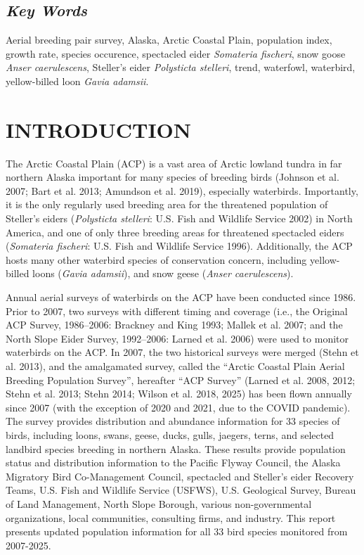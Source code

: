 \documentclass[
]{article}
\begin{document}
\subsection*{\texorpdfstring{\emph{Key
Words}}{Key Words}}\label{key-words}

Aerial breeding pair survey, Alaska, Arctic Coastal Plain, population
index, growth rate, species occurence, spectacled eider \emph{Somateria
fischeri}, snow goose \emph{Anser caerulescens}, Steller's eider
\emph{Polysticta stelleri}, trend, waterfowl, waterbird, yellow-billed
loon \emph{Gavia adamsii}.

\newpage{}

\section*{INTRODUCTION}\label{introduction}

The Arctic Coastal Plain (ACP) is a vast area of Arctic lowland tundra
in far northern Alaska important for many species of breeding birds
(Johnson et al. 2007; Bart et al. 2013; Amundson et al. 2019),
especially waterbirds. Importantly, it is the only regularly used
breeding area for the threatened population of Steller's eiders
(\emph{Polysticta stelleri}: U.S. Fish and Wildlife Service 2002) in
North America, and one of only three breeding areas for threatened
spectacled eiders (\emph{Somateria fischeri}: U.S. Fish and Wildlife
Service 1996). Additionally, the ACP hosts many other waterbird species
of conservation concern, including yellow-billed loons (\emph{Gavia
adamsii}), and snow geese (\emph{Anser caerulescens}).

Annual aerial surveys of waterbirds on the ACP have been conducted since
1986. Prior to 2007, two surveys with different timing and coverage
(i.e., the Original ACP Survey, 1986--2006: Brackney and King 1993;
Mallek et al. 2007; and the North Slope Eider Survey, 1992--2006: Larned
et al. 2006) were used to monitor waterbirds on the ACP. In 2007, the
two historical surveys were merged (Stehn et al. 2013), and the
amalgamated survey, called the ``Arctic Coastal Plain Aerial Breeding
Population Survey'', hereafter ``ACP Survey'' (Larned et al. 2008, 2012;
Stehn et al. 2013; Stehn 2014; Wilson et al. 2018, 2025) has been flown
annually since 2007 (with the exception of 2020 and 2021, due to the
COVID pandemic). The survey provides distribution and abundance
information for 33 species of birds, including loons, swans, geese,
ducks, gulls, jaegers, terns, and selected landbird species breeding in
northern Alaska. These results provide population status and
distribution information to the Pacific Flyway Council, the Alaska
Migratory Bird Co-Management Council, spectacled and Steller's eider
Recovery Teams, U.S. Fish and Wildlife Service (USFWS), U.S. Geological
Survey, Bureau of Land Management, North Slope Borough, various
non-governmental organizations, local communities, consulting firms, and
industry. This report presents updated population information for all 33
bird species monitored from 2007-2025.
\end{document}
